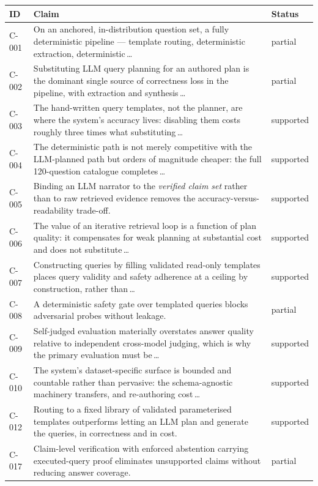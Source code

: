 \begin{tabular}{@{}L{0.08\textwidth}L{0.62\textwidth}L{0.18\textwidth}@{}}
\toprule
ID & Claim & Status \\
\midrule
C-001 & On an anchored, in-distribution question set, a fully deterministic pipeline --- template routing, deterministic extraction, deterministic\,\ldots & partial \\
C-002 & Substituting LLM query planning for an authored plan is the dominant single source of correctness loss in the pipeline, with extraction and synthesis\,\ldots & partial \\
C-003 & The hand-written query templates, not the planner, are where the system's accuracy lives: disabling them costs roughly three times what substituting\,\ldots & supported \\
C-004 & The deterministic path is not merely competitive with the LLM-planned path but orders of magnitude cheaper: the full 120-question catalogue completes\,\ldots & supported \\
C-005 & Binding an LLM narrator to the \emph{verified claim set} rather than to raw retrieved evidence removes the accuracy-versus-readability trade-off. & supported \\
C-006 & The value of an iterative retrieval loop is a function of plan quality: it compensates for weak planning at substantial cost and does not substitute\,\ldots & supported \\
C-007 & Constructing queries by filling validated read-only templates places query validity and safety adherence at a ceiling by construction, rather than\,\ldots & supported \\
C-008 & A deterministic safety gate over templated queries blocks adversarial probes without leakage. & partial \\
C-009 & Self-judged evaluation materially overstates answer quality relative to independent cross-model judging, which is why the primary evaluation must be\,\ldots & supported \\
C-010 & The system's dataset-specific surface is bounded and countable rather than pervasive: the schema-agnostic machinery transfers, and re-authoring cost\,\ldots & supported \\
C-012 & Routing to a fixed library of validated parameterised templates outperforms letting an LLM plan and generate the queries, in correctness and in cost. & supported \\
C-017 & Claim-level verification with enforced abstention carrying executed-query proof eliminates unsupported claims without reducing answer coverage. & partial \\

\end{tabular}
